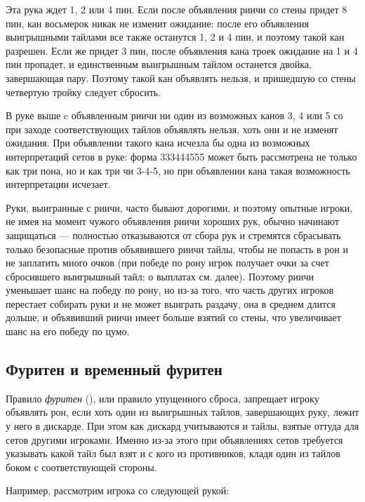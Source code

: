 
Эта рука ждет 1, 2 или 4 пин. Если после объявления риичи со стены придет 8 пин, кан восьмерок никак не изменит ожидание: после его объявления выигрышными тайлами все также останутся 1, 2 и 4 пин, и поэтому такой кан разрешен. Если же придет 3 пин, после объявления кана троек ожидание на 1 и 4 пин пропадет, и единственным выигрышным тайлом останется двойка, завершающая пару. Поэтому такой кан объявлять нельзя, и пришедшую со стены четвертую тройку следует сбросить. 


В руке выше c объявленным риичи ни один из возможных канов 3, 4 или 5 со при заходе соответствующих тайлов объявлять нельзя, хоть они и не изменят ожидания. При объявлении такого кана исчезла бы одна из возможных интерпретаций сетов в руке: форма 333444555 может быть рассмотрена не только как три пона, но и как три чи 3-4-5, но при объявлении кана такая возможность интерпретации исчезает. 

Руки, выигранные с риичи, часто бывают дорогими, и поэтому опытные игроки, не имея на момент чужого объявления риичи хороших рук, обычно начинают защищаться --- полностью отказываются от сбора рук и стремятся сбрасывать только безопасные против объявившего риичи тайлы, чтобы не попасть в рон и не заплатить много очков (при победе по рону игрок получает очки за счет сбросившего выигрышный тайл; о выплатах см. далее). Поэтому риичи уменьшает шанс на победу по рону, но из-за того, что часть других игроков перестает собирать руки и не может выиграть раздачу, она в среднем длится дольше, и объявивший риичи имеет больше взятий со стены, что увеличивает шанс на его победу по цумо.

\subsection{Фуритен и временный фуритен}

Правило \textit{фуритен} (), или правило упущенного сброса, запрещает игроку объявлять рон, если хоть один из выигрышных тайлов, завершающих руку, лежит у него в дискарде. При этом как дискард учитываются и тайлы, взятые оттуда для сетов другими игроками. Именно из-за этого при объявлениях сетов требуется указывать какой тайл был взят и с кого из противников, кладя один из тайлов боком с соответствующей стороны.

Например, рассмотрим игрока со следующей рукой:

